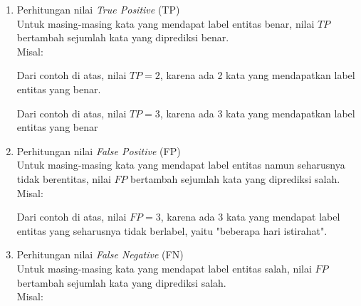 \begin{enumerate}
	\item Perhitungan nilai \textit{True Positive} (TP)\\
	Untuk masing-masing kata yang mendapat label entitas benar, nilai $ TP $ bertambah sejumlah kata yang diprediksi benar.\\
	Misal:
	
	
	Dari contoh di atas, nilai $ TP = 2 $, karena ada 2 kata yang mendapatkan label entitas yang benar.
	

	Dari contoh di atas, nilai $ TP = 3 $, karena ada 3 kata yang mendapatkan label entitas yang benar
	
	\item Perhitungan nilai \textit{False Positive} (FP)\\
	Untuk masing-masing kata yang mendapat label entitas namun seharusnya tidak berentitas,  nilai $ FP $ bertambah sejumlah kata yang diprediksi salah.\\
	Misal:
	

	Dari contoh di atas, nilai $ FP = 3 $, karena ada 3 kata yang mendapat label entitas yang seharusnya tidak berlabel, yaitu "beberapa hari istirahat".
			
	\item Perhitungan nilai \textit{False Negative} (FN)\\
	Untuk masing-masing kata yang mendapat label entitas salah,  nilai $ FP $ bertambah sejumlah kata yang diprediksi salah.\\
	Misal:
	

\end{enumerate}
